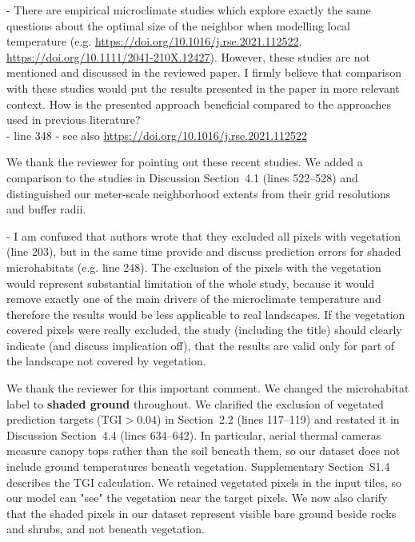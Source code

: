 \documentclass[12pt,english]{reviewresponse}
\begin{document}
\begin{revcomment}
- There are empirical microclimate studies which explore exactly the same questions about the optimal size of the neighbor when modelling local temperature (e.g. \url{https://doi.org/10.1016/j.rse.2021.112522}, \url{https://doi.org/10.1111/2041-210X.12427}). However, these studies are not mentioned and discussed in the reviewed paper. I firmly believe that comparison with these studies would put the results presented in the paper in more relevant context. How is the presented approach beneficial compared to the approaches used in previous literature?\\
- line 348 - see also \url{https://doi.org/10.1016/j.rse.2021.112522}
\end{revcomment}

\begin{revresponse}
We thank the reviewer for pointing out these recent studies. We added a comparison to the studies in Discussion Section~4.1 (lines 522--528) and distinguished our meter-scale neighborhood extents from their grid resolutions and buffer radii. 
\end{revresponse}

\begin{revcomment}
- I am confused that authors wrote that they excluded all pixels with vegetation (line 203), but in the same time provide and discuss prediction errors for shaded microhabitats (e.g. line 248). The exclusion of the pixels with the vegetation would represent substantial limitation of the whole study, because it would remove exactly one of the main drivers of the microclimate temperature and therefore the results would be less applicable to real landscapes. If the vegetation covered pixels were really excluded, the study (including the title) should clearly indicate (and discuss implication off), that the results are valid only for part of the landscape not covered by vegetation.
\end{revcomment}

\begin{revresponse}
We thank the reviewer for this important comment. We changed the microhabitat label to \textbf{shaded ground} throughout. We clarified the exclusion of vegetated prediction targets ($\text{TGI} > 0.04$) in Section~2.2 (lines 117--119) and restated it in Discussion Section~4.4 (lines 634--642). In particular, aerial thermal cameras measure canopy tops rather than the soil beneath them, so our dataset does not include ground temperatures beneath vegetation. Supplementary Section~S1.4 describes the TGI calculation. We retained vegetated pixels in the input tiles, so our model can "see" the vegetation near the target pixels. We now also clarify that the shaded pixels in our dataset represent visible bare ground beside rocks and shrubs, and not beneath vegetation.
\end{revresponse}
\end{document}
